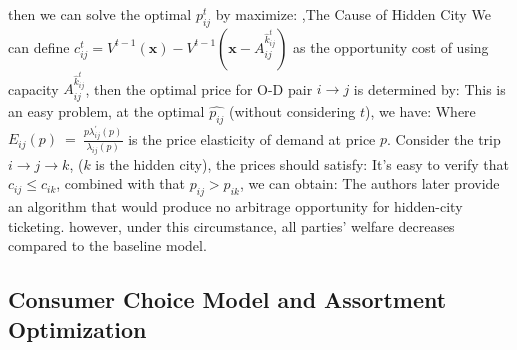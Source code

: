 \documentclass[10pt]{report}
\begin{document}
then we can solve the optimal $p^t_{ij}$ by maximize:
\sep{The Cause of Hidden City}
We can define $c_{ij}^t=V^{t-1}(\boldsymbol{x})-V^{t-1}(\boldsymbol{x}-A_{ij}^{\hat{k}_{ij}^t})$ as the opportunity cost of using capacity $A_{ij}^{\hat{k}_{ij}^t}$, then the optimal price for O-D pair $i\to j$ is determined by:
This is an easy problem, at the optimal $\hat{p_{ij}}$ (without considering $t$), we have:
Where $E_{ij}(p)~=~\frac{p\lambda_{ij}^{\prime}(p)}{\lambda_{ij}(p)}$ is the price elasticity of demand at price $p$. Consider the trip $i\to j\to k$, ($k$ is the hidden city), the prices should satisfy:
It's easy to verify that $c_{ij}\le c_{ik}$, combined with that $p_{ij} > p_{ik}$, we can obtain:
The authors later provide an algorithm that would produce no arbitrage opportunity for hidden-city ticketing. however, under this circumstance, all parties' welfare
decreases compared to the baseline model.

\subsection{Consumer Choice Model and Assortment Optimization}
\end{document}
